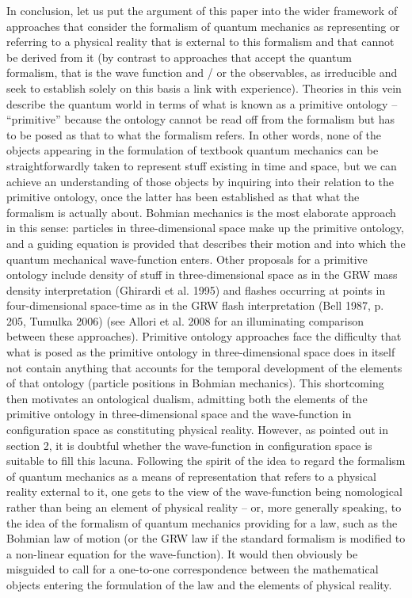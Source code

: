 \documentclass[12pt,a4paper]{article}
\theoremstyle{definition}
\begin{document}
In conclusion, let us put the argument of this paper into the wider framework of approaches that consider the formalism of quantum mechanics as representing or referring to a physical reality that is external to this formalism and that cannot be derived from it (by contrast to approaches that accept the quantum formalism, that is the wave function and / or the observables, as irreducible and seek to establish solely on this basis a link with experience). Theories in this vein describe the quantum world in terms of what is known as a primitive ontology -- ``primitive'' because the ontology cannot be read off from the formalism but has to be posed as that to what the formalism refers. In other words, none of the objects appearing in the formulation of textbook quantum mechanics can be straightforwardly taken to represent stuff existing in time and space, but we can achieve an understanding of those objects by inquiring into their relation to the primitive ontology, once the latter has been established as that what the formalism is actually about. Bohmian mechanics is the most elaborate approach in this sense: particles in three-dimensional space make up the primitive ontology, and a guiding equation is provided that describes their motion and into which the quantum mechanical wave-function enters. Other proposals for a primitive ontology include density of stuff in three-dimensional space as in the GRW mass density interpretation (Ghirardi et al. 1995) and flashes occurring at points in four-dimensional space-time as in the GRW flash interpretation (Bell 1987, p. 205, Tumulka 2006) (see Allori et al. 2008 for an illuminating comparison between these approaches).
Primitive ontology approaches face the difficulty that what is posed as the primitive ontology in three-dimensional space does in itself not contain anything that accounts for the temporal development of the elements of that ontology (particle positions in Bohmian mechanics). This shortcoming then motivates an ontological dualism, admitting both the elements of the primitive ontology in three-dimensional space and the wave-function in configuration space as constituting physical reality. However, as pointed out in section 2, it is doubtful whether the wave-function in configuration space is suitable to fill this lacuna. Following the spirit of the idea to regard the formalism of quantum mechanics as a means of representation that refers to a physical reality external to it, one gets to the view of the wave-function being nomological rather than being an element of physical reality -- or, more generally speaking, to the idea of the formalism of quantum mechanics providing for a law, such as the Bohmian law of motion (or the GRW law if the standard formalism is modified to a non-linear equation for the wave-function). It would then obviously be misguided to call for a one-to-one correspondence between the mathematical objects entering the formulation of the law and the elements of physical reality.
\end{document}
